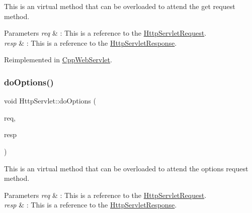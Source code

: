 This is an virtual method that can be overloaded to attend the get request method. 


\begin{DoxyParams}{Parameters}
{\em req} & \+: This is a reference to the \hyperlink{class_http_servlet_request}{Http\+Servlet\+Request}. \\
\hline
{\em resp} & \+: This is a reference to the \hyperlink{class_http_servlet_response}{Http\+Servlet\+Response}. \\
\hline
\end{DoxyParams}


Reimplemented in \hyperlink{class_cpp_web_servlet_a8d32d5ba8ba73c10a7c1abc81497d898}{Cpp\+Web\+Servlet}.

\mbox{\label{class_http_servlet_a1abc608f8ac9b682a59f2231775330c6}} 
\subsubsection{\texorpdfstring{do\+Options()}{doOptions()}}
{\footnotesize\ttfamily void Http\+Servlet\+::do\+Options (\begin{DoxyParamCaption}\item[{\hyperlink{class_http_servlet_request}{Http\+Servlet\+Request} \&}]{req,  }\item[{\hyperlink{class_http_servlet_response}{Http\+Servlet\+Response} \&}]{resp }\end{DoxyParamCaption})\hspace{0.3cm}{\ttfamily [virtual]}}



This is an virtual method that can be overloaded to attend the options request method. 


\begin{DoxyParams}{Parameters}
{\em req} & \+: This is a reference to the \hyperlink{class_http_servlet_request}{Http\+Servlet\+Request}. \\
\hline
{\em resp} & \+: This is a reference to the \hyperlink{class_http_servlet_response}{Http\+Servlet\+Response}. \\
\hline
\end{DoxyParams}
\mbox{\label{class_http_servlet_a6b94fb3bb052b2138ee673feb65e37c9}} 
